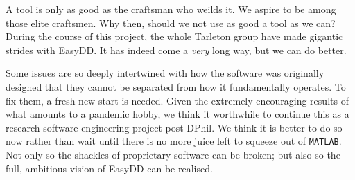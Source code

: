 A tool is only as good as the craftsman who weilds it. We aspire to be among those elite craftsmen. Why then, should we not use as good a tool as we can? During the course of this project, the whole Tarleton group have made gigantic strides with EasyDD. It has indeed come a \emph{very} long way, but we can do better.

Some issues are so deeply intertwined with how the software was originally designed that they cannot be separated from how it fundamentally operates. To fix them, a fresh new start is needed. Given the extremely encouraging results of what amounts to a pandemic hobby, we think it worthwhile to continue this as a research software engineering project post-DPhil. We think it is better to do so now rather than wait until there is no more juice left to squeeze out of \texttt{MATLAB}. Not only so the shackles of proprietary software can be broken; but also so the full, ambitious vision of EasyDD can be realised.
